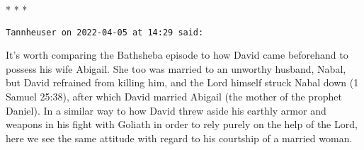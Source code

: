 
\begin{center}* * *\end{center}

\begin{footnotesize}\begin{sffamily}



\texttt{Tannheuser on 2022-04-05 at 14:29 said: }

It's worth comparing the Bathsheba episode to how David came beforehand to possess his wife Abigail. She too was married to an unworthy husband, Nabal, but David refrained from killing him, and the Lord himself struck Nabal down (1 Samuel 25:38), after which David married Abigail (the mother of the prophet Daniel). In a similar way to how David threw aside his earthly armor and weapons in his fight with Goliath in order to rely purely on the help of the Lord, here we see the same attitude with regard to his courtship of a married woman.


\end{sffamily}\end{footnotesize}
